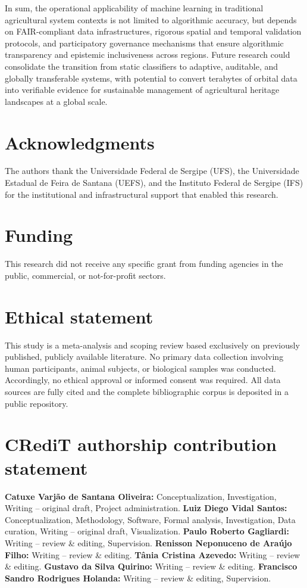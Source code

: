 \documentclass[lineno,pdflatex,sn-apa]{sn-jnl}
\begin{document}
In sum, the operational applicability of machine learning in traditional agricultural system contexts is not limited to algorithmic accuracy, but depends on FAIR-compliant data infrastructures, rigorous spatial and temporal validation protocols, and participatory governance mechanisms that ensure algorithmic transparency and epistemic inclusiveness across regions. Future research could consolidate the transition from static classifiers to adaptive, auditable, and globally transferable systems, with potential to convert terabytes of orbital data into verifiable evidence for sustainable management of agricultural heritage landscapes at a global scale.

\section*{Acknowledgments}

The authors thank the Universidade Federal de Sergipe (UFS), the Universidade Estadual de Feira de Santana (UEFS), and the Instituto Federal de Sergipe (IFS) for the institutional and infrastructural support that enabled this research.

\section*{Funding}

This research did not receive any specific grant from funding agencies in the public, commercial, or not-for-profit sectors.

\section*{Ethical statement}

This study is a meta-analysis and scoping review based exclusively on previously published, publicly available literature. No primary data collection involving human participants, animal subjects, or biological samples was conducted. Accordingly, no ethical approval or informed consent was required. All data sources are fully cited and the complete bibliographic corpus is deposited in a public repository.

\section*{CRediT authorship contribution statement}

\textbf{Catuxe Varjão de Santana Oliveira:} Conceptualization, Investigation, Writing -- original draft, Project administration. \textbf{Luiz Diego Vidal Santos:} Conceptualization, Methodology, Software, Formal analysis, Investigation, Data curation, Writing -- original draft, Visualization. \textbf{Paulo Roberto Gagliardi:} Writing -- review \& editing, Supervision. \textbf{Renisson Neponuceno de Araújo Filho:} Writing -- review \& editing. \textbf{Tânia Cristina Azevedo:} Writing -- review \& editing. \textbf{Gustavo da Silva Quirino:} Writing -- review \& editing. \textbf{Francisco Sandro Rodrigues Holanda:} Writing -- review \& editing, Supervision.
\end{document}

